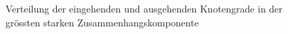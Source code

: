 \begin{figure}[th!]
  \centering
  \caption{Verteilung der eingehenden  und
    ausgehenden  Knotengrade in der gr\"ossten
    starken Zusammenhangskomponente}
  \label{fig:degree-dist}
\end{figure}

